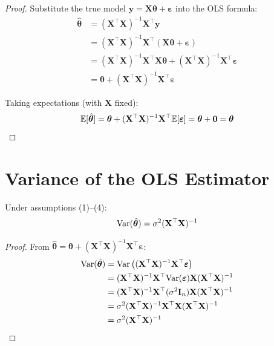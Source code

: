 \documentclass[main.tex]{subfiles}
\begin{document}
\begin{proof}
Substitute the true model $\mathbf{y} = \mathbf{X}\boldsymbol{\theta} + \boldsymbol{\varepsilon}$ into the OLS formula:
\begin{align}
\hat{\boldsymbol{\theta}} &= (\mathbf{X}^\top\mathbf{X})^{-1}\mathbf{X}^\top\mathbf{y} \\
&= (\mathbf{X}^\top\mathbf{X})^{-1}\mathbf{X}^\top(\mathbf{X}\boldsymbol{\theta} + \boldsymbol{\varepsilon}) \\
&= (\mathbf{X}^\top\mathbf{X})^{-1}\mathbf{X}^\top\mathbf{X}\boldsymbol{\theta} + (\mathbf{X}^\top\mathbf{X})^{-1}\mathbf{X}^\top\boldsymbol{\varepsilon} \\
&= \boldsymbol{\theta} + (\mathbf{X}^\top\mathbf{X})^{-1}\mathbf{X}^\top\boldsymbol{\varepsilon}
\end{align}

Taking expectations (with $\mathbf{X}$ fixed):
$$\mathbb{E}[\hat{\boldsymbol{\theta}}] = \boldsymbol{\theta} + (\mathbf{X}^\top\mathbf{X})^{-1}\mathbf{X}^\top\mathbb{E}[\boldsymbol{\varepsilon}] = \boldsymbol{\theta} + \mathbf{0} = \boldsymbol{\theta}$$
\end{proof}

\needspace{0.33\textheight}
\section{Variance of the OLS Estimator}

\begin{theorem}
Under assumptions (1)--(4):
$$\text{Var}(\hat{\boldsymbol{\theta}}) = \sigma^2 (\mathbf{X}^\top\mathbf{X})^{-1}$$
\end{theorem}

\begin{proof}
From $\hat{\boldsymbol{\theta}} = \boldsymbol{\theta} + (\mathbf{X}^\top\mathbf{X})^{-1}\mathbf{X}^\top\boldsymbol{\varepsilon}$:
\begin{align}
\text{Var}(\hat{\boldsymbol{\theta}}) &= \text{Var}\left((\mathbf{X}^\top\mathbf{X})^{-1}\mathbf{X}^\top\boldsymbol{\varepsilon}\right) \\
&= (\mathbf{X}^\top\mathbf{X})^{-1}\mathbf{X}^\top \text{Var}(\boldsymbol{\varepsilon}) \mathbf{X}(\mathbf{X}^\top\mathbf{X})^{-1} \\
&= (\mathbf{X}^\top\mathbf{X})^{-1}\mathbf{X}^\top (\sigma^2 \mathbf{I}_n) \mathbf{X}(\mathbf{X}^\top\mathbf{X})^{-1} \\
&= \sigma^2 (\mathbf{X}^\top\mathbf{X})^{-1}\mathbf{X}^\top\mathbf{X}(\mathbf{X}^\top\mathbf{X})^{-1} \\
&= \sigma^2 (\mathbf{X}^\top\mathbf{X})^{-1}
\end{align}
\end{proof}
\end{document}
